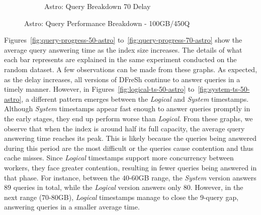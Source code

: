 \begin{figure}
\begin{subfigure}[c]{0.48\textwidth}
		\caption{Astro: Query Breakdown 70 Delay}
		\label{fig:actual-query-breakdown-70-astro}
	\end{subfigure}
	\caption{Astro: Query Performance Breakdown - 100GB/450Q}
	\label{fig:dfresh-query-breakdown-astro}
\end{figure}

%
Figures~\ref{fig:query-progress-50-astro} to~\ref{fig:query-progress-70-astro} show 
the average query answering time as the index size increases. The details of what each
bar represents are explained in the same experiment conducted on the random dataset.
A few observations can be made from these graphs. As expected, as the delay increases,
all versions of DFreSh continue to answer queries in a timely manner. However, in
Figures~\ref{fig:logical-ts-50-astro} to~\ref{fig:system-ts-50-astro}, a different
pattern emerges between the \textit{Logical} and \textit{System} timestamps. Although
\textit{System} timestamps appear fast enough to answer queries promptly in the early
stages, they end up perform worse than \textit{Logical}.
%
From these graphs, we observe that when the index is around half its full capacity,
the average query answering time reaches its peak. This is likely because the queries
being answered during this period are the most difficult or the queries cause contention
and thus cache misses. Since \textit{Logical} timestamps support more concurrency
between workers, they face greater contention, resulting in fewer queries being
answered in that phase. For instance, between the $40$-$60$GB range, the
\textit{System} version answers $89$ queries in total, while the \textit{Logical}
version answers only $80$. However, in the next range ($70$-$80$GB), \textit{Logical}
timestamps manage to close the $9$-query gap, answering queries in a smaller
average time.


